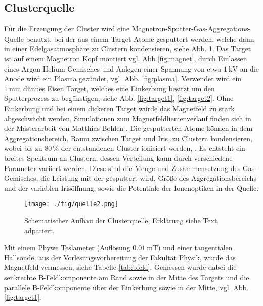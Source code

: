 \subsection{Clusterquelle}
Für die Erzeugung der Cluster wird eine Magnetron-Sputter-Gas-Aggregations-Quelle benutzt, bei der aus einem Target Atome gesputtert werden, welche dann in einer Edelgasatmosphäre zu Clustern kondensieren, siehe Abb. \ref{fig:quelle}.
Das Target ist auf einem Magnetron Kopf montiert vgl. Abb \ref{fig:magnet}, durch Einlassen eines Argon-Helium Gemisches und Anlegen einer Spannung von etwa $\SI{1}{\kV}$ an die Anode wird ein Plasma gezündet, vgl. Abb. \ref{fig:plasma}.
Verwendet wird ein $\SI{1}{\mm}$ dünnes Eisen Target, welches eine Einkerbung besitzt um den Sputterprozess zu begünstigen, siehe Abb. \ref{fig:target1}, \ref{fig:target2}.
Ohne Einkerbung und bei einem dickeren Target würde das Magnetfeld zu stark abgeschwächt werden, Simulationen zum Magnetfeldlienienverlauf finden sich in der Masterarbeit von Matthias Bohlen \cite{bohlen}.
Die gesputterten Atome können in dem Aggregationsbereich, Raum zwischen Target und Iris, zu Clustern kondensieren, wobei bis zu $80\,\%$ der entstandenen Cluster ionisiert werden, \cite{Haberland.1991}.
Es entsteht ein breites Spektrum an Clustern, dessen Verteilung kann durch verschiedene Parameter variiert werden.
Diese sind die Menge und Zusammensetzung des Gas-Gemisches, die Leistung mit der gesputtert wird, Größe des Aggregationsbereichs und der variablen Irisöffnung, sowie die Potentiale der Ionenoptiken in der Quelle.
\begin{figure}
    \centering
    \texttt{[image: ./fig/quelle2.png]}
    \caption{Schematischer Aufbau der Clusterquelle, Erklärung siehe Text, \cite{woltermaster} adpatiert.}
    \label{fig:quelle}
\end{figure}
Mit einem Phywe Teslameter (Auflösung $\SI{0,01}{\milli\tesla}$) und einer tangentialen Hallsonde, aus der Vorlesungsvorbereitung der Fakultät Physik, wurde das Magnetfeld vermessen, siehe Tabelle \ref{tab:bfeld}. %
Gemessen wurde dabei die senkrechte B-Feldkomponente am Rand sowie in der Mitte des Targets und die parallele B-Feldkomponente über der Einkerbung sowie in der Mitte, vgl. Abb. \ref{fig:target1}. 
